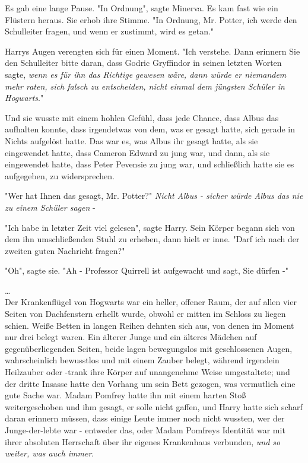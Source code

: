 {Es gab eine lange Pause. "In Ordnung", sagte Minerva. Es kam fast wie ein Flüstern heraus. Sie erhob ihre Stimme. "In Ordnung, Mr. Potter, ich werde den Schulleiter fragen, und wenn er zustimmt, wird es getan."

Harrys Augen verengten sich für einen Moment. "Ich verstehe. Dann erinnern Sie den Schulleiter bitte daran, dass Godric Gryffindor in seinen letzten Worten sagte, \emph{wenn es für ihn das Richtige gewesen wäre, dann würde er niemandem mehr raten, sich falsch zu entscheiden, nicht einmal dem jüngsten Schüler in Hogwarts}."

Und sie wusste mit einem hohlen Gefühl, dass jede Chance, dass Albus das aufhalten konnte, dass irgendetwas von dem, was er gesagt hatte, sich gerade in Nichts aufgelöst hatte. Das war es, was Albus ihr gesagt hatte, als sie eingewendet hatte, dass Cameron Edward zu jung war, und dann, als sie eingewendet hatte, dass Peter Pevensie zu jung war, und schließlich hatte sie es aufgegeben, zu widersprechen.

"Wer hat Ihnen das gesagt, Mr. Potter?" \emph{Nicht Albus - sicher würde Albus das nie zu einem Schüler sagen} -

"Ich habe in letzter Zeit viel gelesen", sagte Harry. Sein Körper begann sich von dem ihn umschließenden Stuhl zu erheben, dann hielt er inne. "Darf ich nach der zweiten guten Nachricht fragen?"

"Oh", sagte sie. "Ah - Professor Quirrell ist aufgewacht und sagt, Sie dürfen -"

…\\ Der Krankenflügel von Hogwarts war ein heller, offener Raum, der auf allen vier Seiten von Dachfenstern erhellt wurde, obwohl er mitten im Schloss zu liegen schien. Weiße Betten in langen Reihen dehnten sich aus, von denen im Moment nur drei belegt waren. Ein älterer Junge und ein älteres Mädchen auf gegenüberliegenden Seiten, beide lagen bewegungslos mit geschlossenen Augen, wahrscheinlich bewusstlos und mit einem Zauber belegt, während irgendein Heilzauber oder -trank ihre Körper auf unangenehme Weise umgestaltete; und der dritte Insasse hatte den Vorhang um sein Bett gezogen, was vermutlich eine gute Sache war. Madam Pomfrey hatte ihn mit einem harten Stoß weitergeschoben und ihm gesagt, er solle nicht gaffen, und Harry hatte sich scharf daran erinnern müssen, dass einige Leute immer noch nicht wussten, wer der Junge-der-lebte war - entweder das, oder Madam Pomfreys Identität war mit ihrer absoluten Herrschaft über ihr eigenes Krankenhaus verbunden, \emph{und so weiter, was auch immer}.

}
